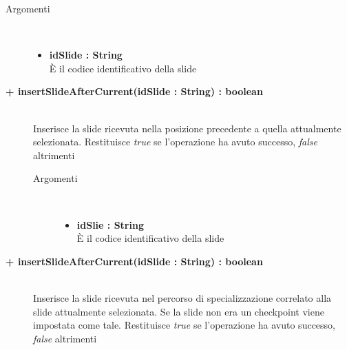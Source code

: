 \begin{description}
\begin{description}
		\begin{description}
			\item[Argomenti] \hfill \\
				\begin{itemize}
				
					\item \textbf{idSlide : String	} \hfill \\
					È il codice identificativo della slide
					
				\end{itemize}
			
		\end{description}
			
	\end{description}
	
	\begin{description}
		\item[\textbf{\color{blue}+ insertSlideAfterCurrent(idSlide : String) : boolean			}] \hfill \\
			Inserisce la slide ricevuta nella posizione precedente a quella attualmente selezionata. Restituisce \textit{true} se l'operazione ha avuto successo, \textit{false} altrimenti
			
		\begin{description}
			\item[Argomenti] \hfill \\
				\begin{itemize}
				
					\item \textbf{idSlie : String	} \hfill \\
					È il codice identificativo della slide
					
				\end{itemize}
			
		\end{description}
			
	\end{description}
	
	\begin{description}
		\item[\textbf{\color{blue}+ insertSlideAfterCurrent(idSlide : String) : boolean			}] \hfill \\
			Inserisce la slide ricevuta nel percorso di specializzazione correlato alla slide attualmente selezionata. Se la slide non era un checkpoint viene impostata come tale. Restituisce \textit{true} se l'operazione ha avuto successo, \textit{false} altrimenti
			

\end{description}
\end{description}

